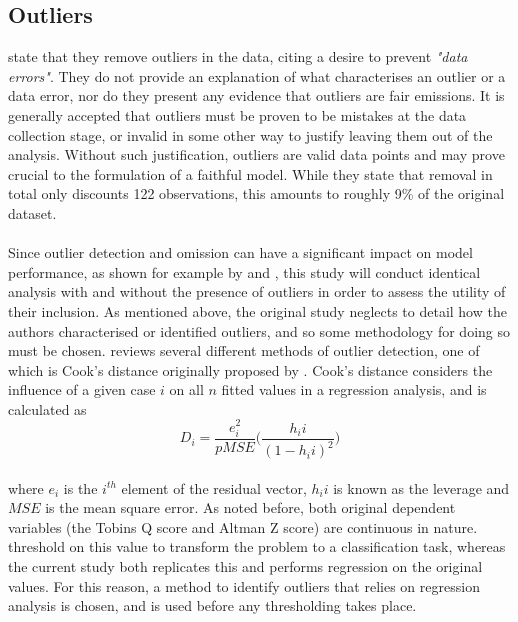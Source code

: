 {\subsection{Outliers}
\cite{moldovan2015learning} state that they remove outliers in the data, citing a desire to prevent {\it "data errors"}. They do not provide an explanation of what characterises an outlier or a data error, nor do they present any evidence that outliers are fair emissions. It is generally accepted that outliers must be proven to be mistakes at the data collection stage, or invalid in some other way to justify leaving them out of the analysis. Without such justification, outliers are valid data points and may prove crucial to the formulation of a faithful model. While they state that removal in total only discounts 122 observations, this amounts to roughly 9\% of the original dataset.\\\\
Since outlier detection and omission can have a significant impact on model performance, as shown for example by \cite{Pollet2017} and \cite{Wobbe2011}, this study will conduct identical analysis with and without the presence of outliers in order to assess the utility of their inclusion. As mentioned above, the original study neglects to detail how the authors characterised or identified outliers, and so some methodology for doing so must be chosen. \cite{denisCookReview} reviews several different methods of outlier detection, one of which is Cook's distance originally proposed by \cite{cookOrig}. Cook's distance considers the influence of a given case $i$ on all $n$ fitted values in a regression analysis, and is calculated as
\begin {equation}\label{CooksDistance}
D_i = \frac{e^2_i}{pMSE} \Big(  \frac{h_ii}{(1 - h_ii)^2}  \Big)
\end{equation}\\
where $e_i$ is the $i^{th}$  element of the residual vector, $h_ii$ is known as the leverage and $MSE$ is the mean square error. As noted before, both original dependent variables (the Tobins Q score and Altman Z score) are continuous in nature. \cite{moldovan2015learning} threshold on this value to transform the problem to a classification task, whereas the current study both replicates this and performs regression on the original values. For this reason, a method to identify outliers that relies on regression analysis is chosen, and is used before any thresholding takes place. 
}
